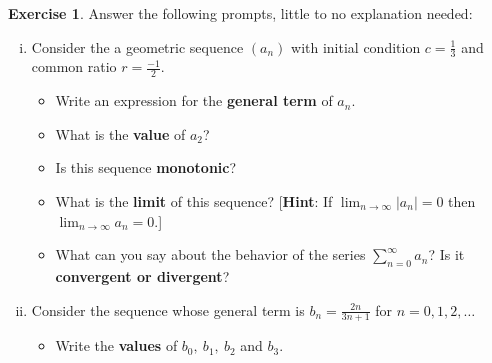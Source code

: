 \documentclass[12pt]{article}
\theoremstyle{plain}
\theoremstyle{definition}
\newtheorem{Ej}[Th]{Exercise}         %
\theoremstyle{remark}
\renewcommand{\:}{\colon}           %
\renewcommand{\.}{\Cdot}                %
\begin{document}

\begin{Ej}
Answer the following prompts, little to no explanation needed:
\vspace*{-0.6em}
\begin{enumerate}[i)]
  \item Consider the a geometric sequence $(a_n)$ with initial condition $c=\frac{1}{3}$ and common ratio $r=\frac{-1}{2}$. 
  \vspace*{-0.8em}
  \begin{itemize}
    \item Write an expression for the \textbf{general term} of $a_n$.
    \begin{ptcb}
   \vspace*{0.54cm}
    \end{ptcb}
    \item What is the \textbf{value} of $a_2$?
    \begin{ptcb}
      \vspace*{0.54cm}
      \end{ptcb}
    \item Is this sequence \textbf{monotonic}?
    \begin{ptcb}
      \vspace*{0.54cm}
      \end{ptcb}
    \item What is the \textbf{limit }of this sequence? [\textbf{Hint}: If $\displaystyle\lim_{n\to\infty}|a_n|=0$ then $\displaystyle\lim_{n\to\infty}a_n =0$.]
    \begin{ptcb}
      \vspace*{0.54cm}
      \end{ptcb}
    \vspace*{-0.9em}
    \item What can you say about the behavior of the series $\displaystyle\sum_{n=0}^\infty a_n$? Is it \textbf{convergent or divergent}?
    \begin{ptcb}
      \vspace*{0.54cm}
      \end{ptcb}
  \end{itemize}
  \item Consider the sequence whose general term is $b_n=\frac{2n}{3n+1}$ for $n=0,1,2,\dots$
  \vspace*{-0.8em}
  \begin{itemize}
    \item Write the \textbf{values} of $b_0,\ b_1,\ b_2$ and $b_3$.

\end{itemize}
\end{enumerate}
\end{Ej}
\end{document}
